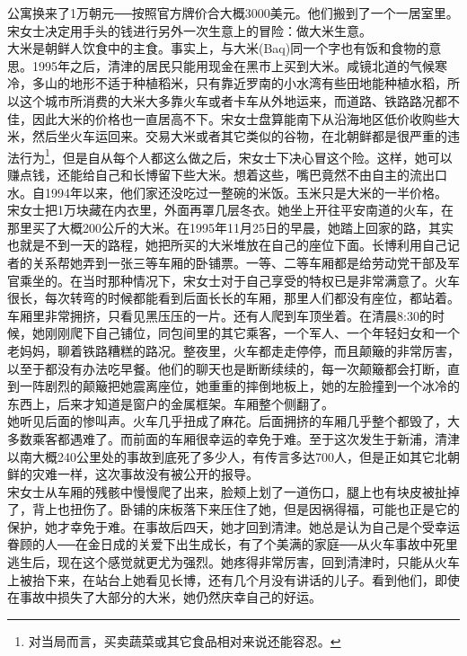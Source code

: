 \begin{multicols}{\theparacolNo}
公寓换来了1万朝元──按照官方牌价合大概3000美元。他们搬到了一个一居室里。宋女士决定用手头的钱进行另外一次生意上的冒险：做大米生意。\\

大米是朝鲜人饮食中的主食。事实上，与大米(Baq)同一个字也有饭和食物的意思。1995年之后，清津的居民只能用现金在黑市上买到大米。咸镜北道的气候寒冷，多山的地形不适于种植稻米，只有靠近罗南的小水湾有些田地能种植水稻，所以这个城市所消费的大米大多靠火车或者卡车从外地运来，而道路、铁路路况都不佳，因此大米的价格也一直居高不下。宋女士盘算能南下从沿海地区低价收购些大米，然后坐火车运回来。交易大米或者其它类似的谷物，在北朝鲜都是很严重的违法行为\footnote{对当局而言，买卖蔬菜或其它食品相对来说还能容忍。}，但是自从每个人都这么做之后，宋女士下决心冒这个险。这样，她可以赚点钱，还能给自己和长博留下些大米。想着这些，嘴巴竟然不由自主的流出口水。自1994年以来，他们家还没吃过一整碗的米饭。玉米只是大米的一半价格。\\

宋女士把1万块藏在内衣里，外面再罩几层冬衣。她坐上开往平安南道的火车，在那里买了大概200公斤的大米。在1995年11月25日的早晨，她踏上回家的路，其实也就是不到一天的路程，她把所买的大米堆放在自己的座位下面。长博利用自己记者的关系帮她弄到一张三等车厢的卧铺票。一等、二等车厢都是给劳动党干部及军官乘坐的。在当时那种情况下，宋女士对于自己享受的特权已是非常满意了。火车很长，每次转弯的时候都能看到后面长长的车厢，那里人们都没有座位，都站着。车厢里非常拥挤，只看见黑压压的一片。还有人爬到车顶坐着。在清晨8:30的时候，她刚刚爬下自己铺位，同包间里的其它乘客，一个军人、一个年轻妇女和一个老妈妈，聊着铁路糟糕的路况。整夜里，火车都走走停停，而且颠簸的非常厉害，以至于都没有办法吃早餐。他们的聊天也是断断续续的，每一次颠簸都会打断，直到一阵剧烈的颠簸把她震离座位，她重重的摔倒地板上，她的左脸撞到一个冰冷的东西上，后来才知道是窗户的金属框架。车厢整个侧翻了。\\

她听见后面的惨叫声。火车几乎扭成了麻花。后面拥挤的车厢几乎整个都毁了，大多数乘客都遇难了。而前面的车厢很幸运的幸免于难。至于这次发生于新浦，清津以南大概240公里处的事故到底死了多少人，有传言多达700人，但是正如其它北朝鲜的灾难一样，这次事故没有被公开的报导。\\

宋女士从车厢的残骸中慢慢爬了出来，脸颊上划了一道伤口，腿上也有块皮被扯掉了，背上也扭伤了。卧铺的床板落下来压住了她，但是因祸得福，可能也正是它的保护，她才幸免于难。在事故后四天，她才回到清津。她总是认为自己是个受幸运眷顾的人──在金日成的关爱下出生成长，有了个美满的家庭──从火车事故中死里逃生后，现在这个感觉就更尤为强烈。她疼得非常厉害，回到清津时，只能从火车上被抬下来，在站台上她看见长博，还有几个月没有讲话的儿子。看到他们，即使在事故中损失了大部分的大米，她仍然庆幸自己的好运。\\


\end{multicols}
